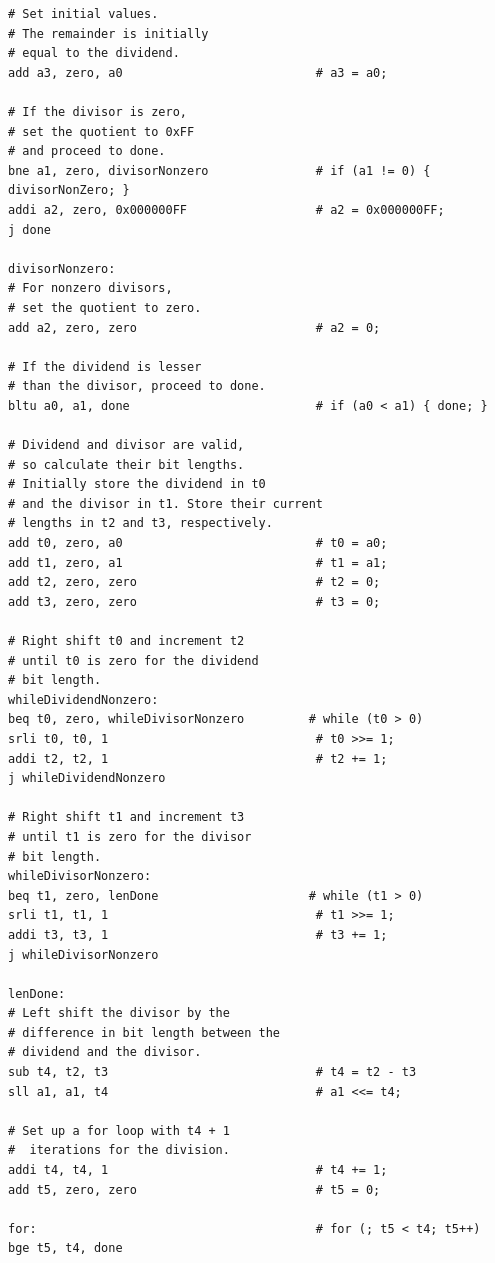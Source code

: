 \documentclass[11pt]{article}
\begin{document}
\begin{Verbatim}
# Set initial values. 
# The remainder is initially 
# equal to the dividend.
add a3, zero, a0                           # a3 = a0;

# If the divisor is zero, 
# set the quotient to 0xFF 
# and proceed to done. 
bne a1, zero, divisorNonzero               # if (a1 != 0) { divisorNonZero; }         
addi a2, zero, 0x000000FF                  # a2 = 0x000000FF;                            
j done

divisorNonzero:
# For nonzero divisors, 
# set the quotient to zero.
add a2, zero, zero                         # a2 = 0;

# If the dividend is lesser 
# than the divisor, proceed to done.
bltu a0, a1, done                          # if (a0 < a1) { done; }

# Dividend and divisor are valid, 
# so calculate their bit lengths. 
# Initially store the dividend in t0
# and the divisor in t1. Store their current
# lengths in t2 and t3, respectively.
add t0, zero, a0                           # t0 = a0;
add t1, zero, a1                           # t1 = a1;
add t2, zero, zero                         # t2 = 0;
add t3, zero, zero                         # t3 = 0;

# Right shift t0 and increment t2 
# until t0 is zero for the dividend
# bit length.
whileDividendNonzero:                      
beq t0, zero, whileDivisorNonzero         # while (t0 > 0)
srli t0, t0, 1                             # t0 >>= 1;
addi t2, t2, 1                             # t2 += 1;
j whileDividendNonzero

# Right shift t1 and increment t3 
# until t1 is zero for the divisor
# bit length.
whileDivisorNonzero: 
beq t1, zero, lenDone                     # while (t1 > 0)
srli t1, t1, 1                             # t1 >>= 1;
addi t3, t3, 1                             # t3 += 1;
j whileDivisorNonzero

lenDone:
# Left shift the divisor by the 
# difference in bit length between the
# dividend and the divisor.
sub t4, t2, t3                             # t4 = t2 - t3
sll a1, a1, t4                             # a1 <<= t4;

# Set up a for loop with t4 + 1
#  iterations for the division.
addi t4, t4, 1                             # t4 += 1;
add t5, zero, zero                         # t5 = 0;

for:                                       # for (; t5 < t4; t5++)
bge t5, t4, done


\end{Verbatim}
\end{document}
